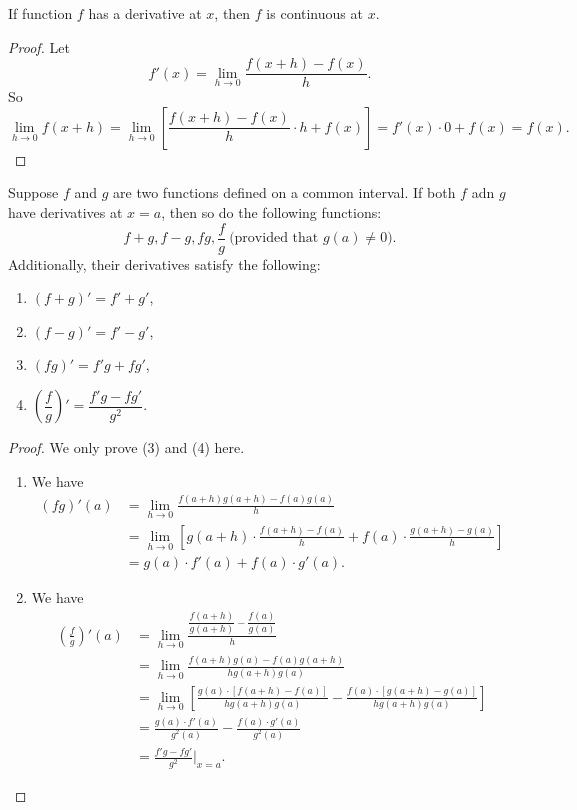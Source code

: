 \documentclass[a4paper]{ctexart}
\begin{document}
	\begin{mythm}
		If function $f$ has a derivative at $x$, then $f$ is continuous at $x$.
	\end{mythm}
	\begin{proof}
		Let
		\[
		f'(x)=\lim_{h\to 0} \frac{f(x+h)-f(x)}{h}.
		\]
		So
		\[
		\lim_{h\to 0} f(x+h) = \lim_{h\to 0} \left[ \frac{f(x+h)-f(x)}{h} \cdot h + f(x) \right] = f'(x)\cdot 0 + f(x) = f(x).
		\]
	\end{proof}
	\begin{mythm}
		Suppose $f$ and $g$ are two functions defined on a common interval. If both $f$ adn $g$ have derivatives at $x=a$, then so do the following functions:
		\[
		f+g,f-g,fg, \frac{f}{g}\ \text{(provided that $g(a)\neq 0$)}.
		\]
		Additionally, their derivatives satisfy the following:
		\begin{enumerate}
			\item[(1)] $(f+g)'=f'+g'$,
			\item[(2)] $(f-g)'=f'-g'$,
			\item[(3)] $(fg)'=f'g+fg'$,
			\item[(4)] $\left(\dfrac{f}{g}\right)'=\dfrac{f'g-fg'}{g^2}$.
		\end{enumerate}
	\end{mythm}
	\begin{proof}
		We only prove (3) and (4) here.
		\begin{enumerate}
			\item[(3)] We have
			\[
			\begin{aligned}
				(fg)'(a) &= \lim_{h\to 0} \frac{f(a+h)g(a+h) - f(a)g(a)}{h}\\[6pt]
				&= \lim_{h\to 0} \left[ g(a+h)\cdot \frac{f(a+h)-f(a)}{h} + f(a)\cdot \frac{g(a+h)-g(a)}{h} \right]\\[6pt]
				&= g(a)\cdot f'(a) + f(a)\cdot g'(a).
			\end{aligned}
			\]
			\item[(4)] We have
			\[
			\begin{aligned}
				\left(\frac{f}{g}\right)'(a) &= \lim_{h\to 0} \frac{\dfrac{f(a+h)}{g(a+h)} - \dfrac{f(a)}{g(a)}}{h}\\[6pt]
				&= \lim_{h\to 0} \frac{f(a+h)g(a) - f(a)g(a+h)}{h g(a+h) g(a)}\\[6pt]
				&= \lim_{h\to 0} \left[ \frac{g(a)\cdot [f(a+h)-f(a)]}{h g(a+h) g(a)} - \frac{f(a)\cdot [g(a+h)-g(a)]}{h g(a+h) g(a)} \right]\\[6pt]
				&= \frac{g(a)\cdot f'(a)}{g^2(a)} - \frac{f(a)\cdot g'(a)}{g^2(a)}\\[6pt]
				&= \frac{f'g - fg'}{g^2}\bigg|_{x=a}.
			\end{aligned}
			\]
		\end{enumerate}
	\end{proof}
\end{document}
